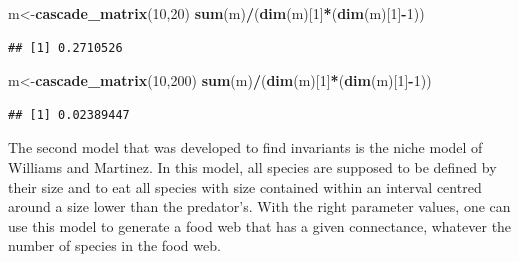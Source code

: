 \documentclass[
]{book}
\newenvironment{Shaded}{\begin{snugshade}}{\end{snugshade}}
\newcommand{\DecValTok}[1]{\textcolor[rgb]{0.00,0.00,0.81}{#1}}
\newcommand{\FloatTok}[1]{\textcolor[rgb]{0.00,0.00,0.81}{#1}}
\newcommand{\FunctionTok}[1]{\textcolor[rgb]{0.13,0.29,0.53}{\textbf{#1}}}
\newcommand{\NormalTok}[1]{#1}
\newcommand{\OtherTok}[1]{\textcolor[rgb]{0.56,0.35,0.01}{#1}}
\newcommand{\SpecialCharTok}[1]{\textcolor[rgb]{0.81,0.36,0.00}{\textbf{#1}}}
\theoremstyle{definition}
\theoremstyle{definition}
\theoremstyle{definition}
\theoremstyle{definition}
\theoremstyle{remark}
\begin{document}
\begin{Shaded}
\begin{Highlighting}[]
\NormalTok{m}\OtherTok{\textless{}{-}}\FunctionTok{cascade\_matrix}\NormalTok{(}\DecValTok{10}\NormalTok{,}\DecValTok{20}\NormalTok{)}
\FunctionTok{sum}\NormalTok{(m)}\SpecialCharTok{/}\NormalTok{(}\FunctionTok{dim}\NormalTok{(m)[}\DecValTok{1}\NormalTok{]}\SpecialCharTok{*}\NormalTok{(}\FunctionTok{dim}\NormalTok{(m)[}\DecValTok{1}\NormalTok{]}\SpecialCharTok{{-}}\DecValTok{1}\NormalTok{))}
\end{Highlighting}
\end{Shaded}

\begin{verbatim}
## [1] 0.2710526
\end{verbatim}

\begin{Shaded}
\begin{Highlighting}[]
\NormalTok{m}\OtherTok{\textless{}{-}}\FunctionTok{cascade\_matrix}\NormalTok{(}\DecValTok{10}\NormalTok{,}\DecValTok{200}\NormalTok{)}
\FunctionTok{sum}\NormalTok{(m)}\SpecialCharTok{/}\NormalTok{(}\FunctionTok{dim}\NormalTok{(m)[}\DecValTok{1}\NormalTok{]}\SpecialCharTok{*}\NormalTok{(}\FunctionTok{dim}\NormalTok{(m)[}\DecValTok{1}\NormalTok{]}\SpecialCharTok{{-}}\DecValTok{1}\NormalTok{))}
\end{Highlighting}
\end{Shaded}

\begin{verbatim}
## [1] 0.02389447
\end{verbatim}

The second model that was developed to find invariants is the niche model of Williams and Martinez. In this model, all species are supposed to be defined by their size and to eat all species with size contained within an interval centred around a size lower than the predator's.
With the right parameter values, one can use this model to generate a food web that has a given connectance, whatever the number of species in the food web.

\begin{Shaded}
\end{Shaded}
\end{document}
